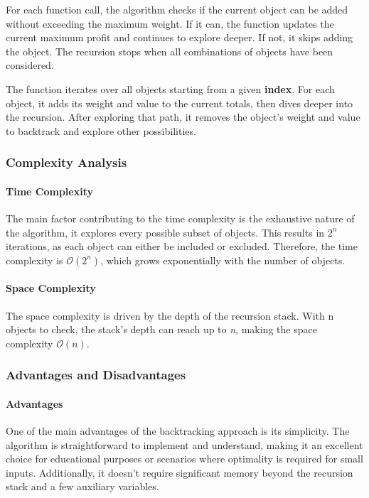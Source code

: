 \documentclass{llncs}
\begin{document}
For each function call, the algorithm checks if the current object can be added without exceeding 
the maximum weight. If it can, the function updates the current maximum profit and continues to 
explore deeper. If not, it skips adding the object. The recursion stops when all combinations of
objects have been considered.

The function iterates over all objects starting from a given \textbf{index}. For each object, it 
adds its weight and value to the current totals, then dives deeper into the recursion. After 
exploring that path, it removes the object's weight and value to backtrack and explore other 
possibilities.

\subsubsection{Complexity Analysis}
\paragraph{Time Complexity}
The main factor contributing to the time complexity is the exhaustive nature of the algorithm, it 
explores every possible subset of objects. This results in \( 2^n \) iterations, as each object can 
either be included or excluded. Therefore, the time complexity is $\mathcal{O}(2^n)$, which grows
exponentially with the number of objects.

\paragraph{Space Complexity}
The space complexity is driven by the depth of the recursion stack. With n objects to check, the 
stack's depth can reach up to \textit{n}, making the space complexity $\mathcal{O}(n)$.

\subsubsection{Advantages and Disadvantages}
\paragraph{Advantages}
One of the main advantages of the backtracking approach is its simplicity. The algorithm is
straightforward to implement and understand, making it an excellent choice for educational purposes
or scenarios where optimality is required for small inputs. Additionally, it doesn't require 
significant memory beyond the recursion stack and a few auxiliary variables.
\end{document}

